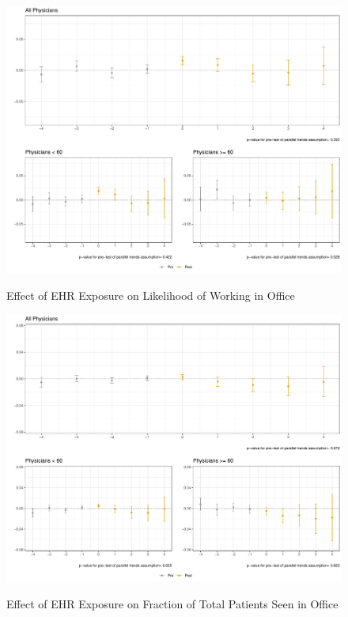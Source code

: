 \documentclass[11pt]{article}
\begin{document}
\begin{figure}[p]
    \centering
    \caption{Effect of EHR Exposure on Likelihood of Working in Office}
    \includegraphics[scale=.57]{Objects/officeind_plot.pdf}
    \label{fig:officefirst}
\end{figure}

\begin{figure}[p]
    \centering
    \caption{Effect of EHR Exposure on Fraction of Total Patients Seen in Office}
    \includegraphics[scale=.57]{Objects/officefrac_plot.pdf}
    \label{fig:officesecond}
\end{figure}
\end{document}
